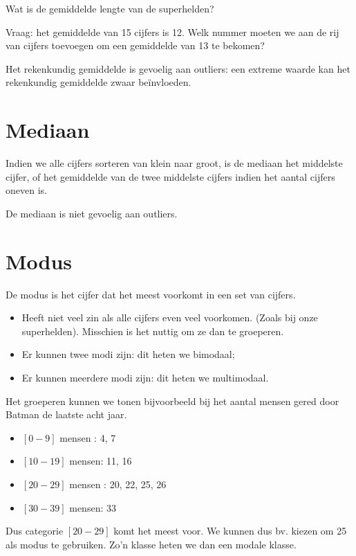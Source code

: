 \begin{exercise}
  Wat is de gemiddelde lengte van de superhelden?
\end{exercise}

\begin{exercise}
  Vraag: het gemiddelde van 15 cijfers is 12. Welk nummer moeten
  we aan de rij van cijfers toevoegen om een gemiddelde van 13 te bekomen?
\end{exercise}

Het rekenkundig gemiddelde is gevoelig aan outliers: een extreme waarde kan het rekenkundig gemiddelde zwaar be\"invloeden.

\section{Mediaan}

\begin{definition}[Mediaan]
  Indien we alle cijfers sorteren van klein naar groot, is de  mediaan het middelste cijfer, of het gemiddelde van de twee middelste cijfers indien het aantal cijfers oneven is.
\end{definition}

De mediaan is niet gevoelig aan outliers.

\section{Modus}
\begin{definition}[Modus]
  De  modus is het cijfer dat het meest voorkomt in een set van cijfers.
\end{definition}

\begin{itemize}
  \item Heeft niet veel zin als alle cijfers even veel voorkomen. (Zoals bij onze superhelden). Misschien is het nuttig om ze dan te groeperen.
  \item Er kunnen twee modi zijn: dit heten we  bimodaal;
  \item Er kunnen meerdere modi zijn: dit heten we  multimodaal.
\end{itemize}

\begin{example}
  Het groeperen kunnen we tonen bijvoorbeeld bij het aantal mensen gered door Batman de laatste acht jaar.
  \begin{itemize}
    \item $[0-9]$ mensen : 4, 7
    \item $[10-19]$ mensen: 11, 16
    \item $[20-29]$ mensen : 20, 22, 25, 26
    \item $[30-39]$ mensen: 33
  \end{itemize}
  Dus categorie $[20-29]$ komt het meest voor. We kunnen dus bv. kiezen om 25 als modus te gebruiken. Zo'n klasse heten we dan een modale klasse.
\end{example}

